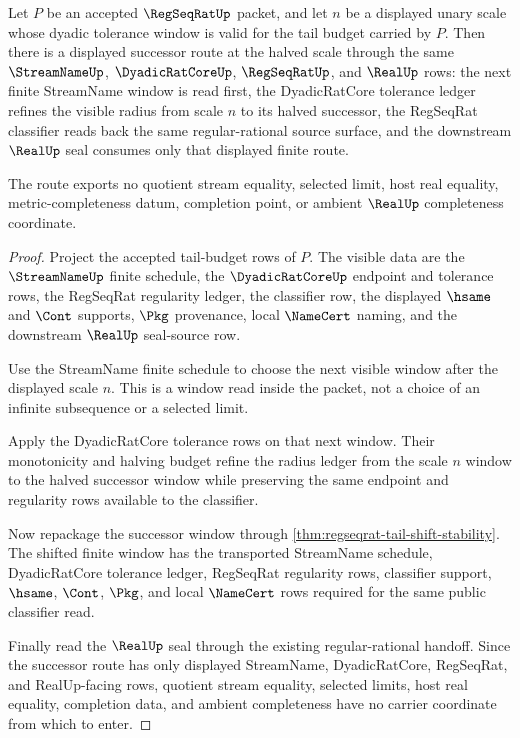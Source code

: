 \begin{theorem}
\label{thm:regseqrat-tail-halving-closure}
Let $P$ be an accepted $\RegSeqRatUp$ packet, and let $n$ be a displayed unary scale whose dyadic tolerance window is valid for the tail budget carried by $P$. Then there is a displayed successor route at the halved scale through the same $\StreamNameUp$, $\DyadicRatCoreUp$, $\RegSeqRatUp$, and $\RealUp$ rows: the next finite StreamName window is read first, the DyadicRatCore tolerance ledger refines the visible radius from scale $n$ to its halved successor, the RegSeqRat classifier reads back the same regular-rational source surface, and the downstream $\RealUp$ seal consumes only that displayed finite route.

The route exports no quotient stream equality, selected limit, host real equality, metric-completeness datum, completion point, or ambient $\RealUp$ completeness coordinate.
\end{theorem}
\begin{proof}
Project the accepted tail-budget rows of $P$. The visible data are the $\StreamNameUp$ finite schedule, the $\DyadicRatCoreUp$ endpoint and tolerance rows, the RegSeqRat regularity ledger, the classifier row, the displayed $\hsame$ and $\Cont$ supports, $\Pkg$ provenance, local $\NameCert$ naming, and the downstream $\RealUp$ seal-source row.

Use the StreamName finite schedule to choose the next visible window after the displayed scale $n$. This is a window read inside the packet, not a choice of an infinite subsequence or a selected limit.

Apply the DyadicRatCore tolerance rows on that next window. Their monotonicity and halving budget refine the radius ledger from the scale $n$ window to the halved successor window while preserving the same endpoint and regularity rows available to the classifier.

Now repackage the successor window through \autoref{thm:regseqrat-tail-shift-stability}. The shifted finite window has the transported StreamName schedule, DyadicRatCore tolerance ledger, RegSeqRat regularity rows, classifier support, $\hsame$, $\Cont$, $\Pkg$, and local $\NameCert$ rows required for the same public classifier read.

Finally read the $\RealUp$ seal through the existing regular-rational handoff. Since the successor route has only displayed StreamName, DyadicRatCore, RegSeqRat, and RealUp-facing rows, quotient stream equality, selected limits, host real equality, completion data, and ambient completeness have no carrier coordinate from which to enter.
\end{proof}

